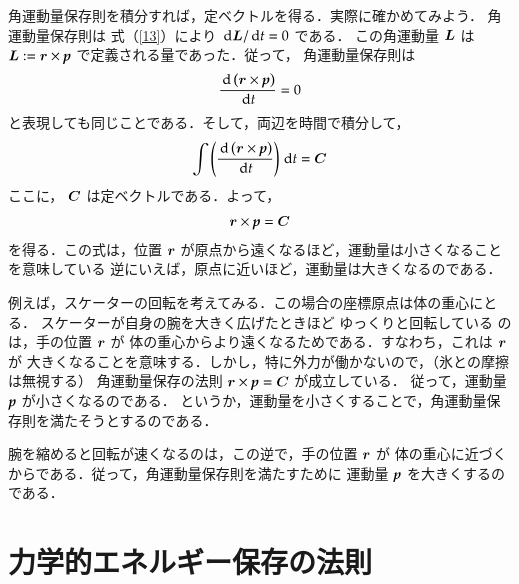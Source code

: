                 角運動量保存則を積分すれば，定ベクトルを得る．実際に確かめてみよう．
                角運動量保存則は 式（\ref{13}）により $\,\mathrm{d}\boldsymbol{L}/\,\mathrm{d} t = 0$ である．
                この角運動量 $\boldsymbol{L}$ は $\boldsymbol{L}
                := \boldsymbol{r} \times \textit{\textbf{p}}$ で定義される量であった．従って，
                角運動量保存則は
                    \begin{align}
                        \frac{\,\mathrm{d} \left(\boldsymbol{r} \times \textit{\textbf{p}}\right)}{\,\mathrm{d} t} = 0
                    \end{align}
                と表現しても同じことである．そして，両辺を時間で積分して，
                    \begin{align}
                        \int\left(\frac{\,\mathrm{d} \left(\boldsymbol{r} \times \textit{\textbf{p}}\right)}{\,\mathrm{d} t}\right) \,\mathrm{d} t = \boldsymbol{C}
                    \end{align}
                ここに， $\boldsymbol{C}$ は定ベクトルである．よって，
                    \begin{align}
                        \boldsymbol{r} \times \textit{\textbf{p}}=\boldsymbol{C}
                    \end{align}
                を得る．この式は，位置 $\boldsymbol{r}$ が原点から遠くなるほど，運動量は小さくなることを意味している
                逆にいえば，原点に近いほど，運動量は大きくなるのである．

                例えば，スケーターの回転を考えてみる．この場合の座標原点は体の重心にとる．
                スケーターが自身の腕を大きく広げたときほど ゆっくりと回転している のは，手の位置 $\boldsymbol{r}$ が
                体の重心からより遠くなるためである．すなわち，これは $\boldsymbol{r}$ が
                大きくなることを意味する．しかし，特に外力が働かないので，（氷との摩擦は無視する）
                角運動量保存の法則 $\boldsymbol{r} \times \textit{\textbf{p}}=\boldsymbol{C}$ が成立している．
                従って，運動量 $\textit{\textbf{p}}$ が小さくなるのである．
                というか，運動量を小さくすることで，角運動量保存則を満たそうとするのである．

                腕を縮めると回転が速くなるのは，この逆で，手の位置 $\boldsymbol{r}$ が
                体の重心に近づくからである．従って，角運動量保存則を満たすために
                運動量 $\textit{\textbf{p}}$ を大きくするのである．


    \section{力学的エネルギー保存の法則}
